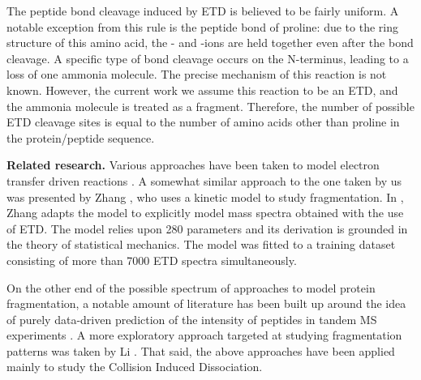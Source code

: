 \documentclass{llncs}
\begin{document}
The peptide bond cleavage induced by ETD is believed to be fairly uniform. A notable exception from this rule is the peptide bond of proline: due to the ring structure of this amino acid, the - and -ions are held together even after the  bond cleavage. A specific type of  bond cleavage occurs on the N-terminus, leading to a loss of one ammonia molecule. The precise mechanism of this reaction is not known. However, the current work we assume this reaction to be an ETD, and the ammonia molecule is treated as a  fragment. Therefore, the number of possible ETD cleavage sites is equal to the number of amino acids other than proline in the protein/peptide sequence.

\textbf{Related research.}
Various approaches have been taken to model electron transfer driven reactions \cite{Breuker2004-az,Simons2010-gy,Zhurov2013-ua,Turecek2013-fq}. A somewhat similar approach to the one taken by us was presented by Zhang \cite{Zhang2004-fp,Zhang2005-jn,Zhang2011-lg}, who uses a kinetic model to study fragmentation.
In \cite{Zhang2010-fp}, Zhang adapts the model to explicitly model mass spectra obtained with the use of ETD. The model relies upon 280 parameters and its derivation is grounded in the theory of statistical mechanics. The model was fitted to a training dataset consisting of more than 7000 ETD spectra simultaneously.

On the other end of the possible spectrum of approaches to model protein fragmentation, a notable amount of literature has been built up around the idea of purely data-driven prediction of the intensity of peptides in tandem MS experiments \cite{Elias2004-fr,Arnold2006-wn,Degroeve2013-ej} . A more exploratory approach targeted at studying fragmentation patterns was taken by Li \cite{Li2011-mq}. That said, the above approaches have been applied mainly to study the Collision Induced Dissociation.
\end{document}
